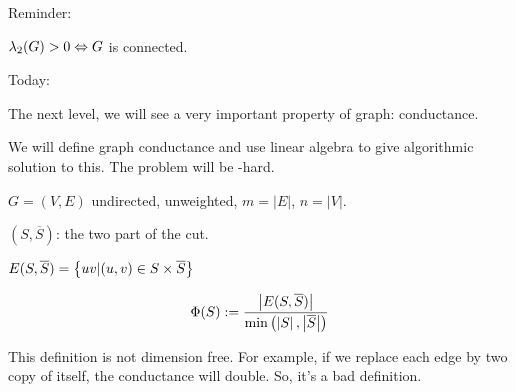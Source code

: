 
Reminder:

\begin{proposition}
    $\lambda_2(G) > 0 \Leftrightarrow G$ is connected.
\end{proposition}

Today:

The next level, we will see a very important property of graph: conductance.

We will define graph conductance and use linear algebra to give algorithmic solution to this. The problem will be \NP-hard.


\begin{notation}
    $G = (V,E)$ undirected, unweighted, $m=\lvert E\rvert$, $n=\lvert V\rvert$.
\end{notation}

\begin{notation}[Cut]
    $(S,\overline{S})$: the two part of the cut.
\end{notation}
    
\begin{notation}
    $E(S,\overline{S}) = \left\{ uv\vert (u,v)\in S\times\overline{S} \right\}$
\end{notation}    
    
\begin{definition}
    \[
        \Phi(S) := \frac{\left\lvert E(S,\overline{S})\right\rvert}{\min\left(\left\lvert S\right\rvert,\left\lvert\overline{S}\right\rvert\right)}
    \]
\end{definition}

This definition is not dimension free. For example, if we replace each edge by two copy of itself, the conductance will double. So, it's a bad definition.


